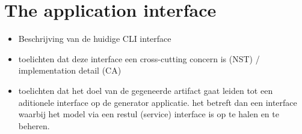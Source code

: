 \section{The application interface} \label{sec_artifact_application_interface}

\begin{itemize}
    \item Beschrijving van de huidige CLI interface
    \item toelichten dat deze interface een cross-cutting concern is (NST) / implementation detail
    (CA)
    \item toelichten dat het doel van de gegeneerde artifact gaat leiden tot een aditionele
    interface op de generator applicatie. het betreft dan een interface waarbij het model via
    een restul (service) interface is op te halen en te beheren.
\end{itemize}